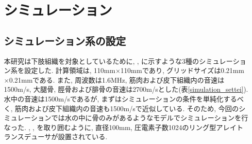 \section{シミュレーション}
\subsection{シミュレーション系の設定}
本研究は下肢組織を対象としているために, ,  に示すような3種のシミュレーション系を設定した. 計算領域は, 110mm$\times$110mmであり, グリッドサイズは0.21mm$\times$0.21mmである. また, 周波数は1.6MHz, 筋肉および皮下組織内の音速は1500m/s, 大腿骨, 脛骨および腓骨の音速は2700m/sとした(表\ref{simulation_settei}). 水中の音速は1500m/sであるが, まずはシミュレーションの条件を単純化するべく, 筋肉および皮下組織内の音速も1500m/sで近似している. そのため, 今回のシミュレーションでは水の中に骨のみがあるようなモデルでシミュレーションを行なった. , ,  を取り囲むように, 直径100mm, 圧電素子数1024のリング型アレイトランスデューサが設置されている. 
